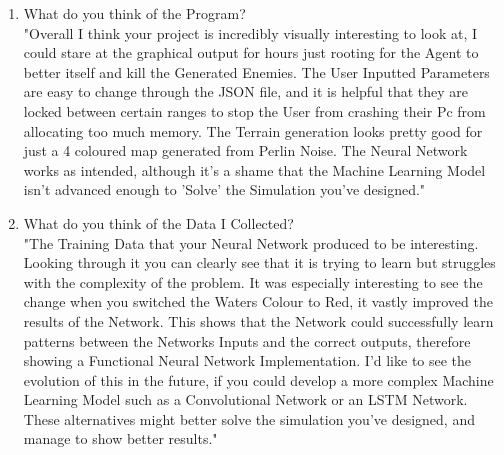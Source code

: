 \begin{flushleft}
        \begin{enumerate}
            \item What do you think of the Program? \\
                \vspace{0.2cm}
                "Overall I think your project is incredibly visually interesting to look at, I could stare at the graphical output for hours
                just rooting for the Agent to better itself and kill the Generated Enemies. The User Inputted Parameters are easy to change
                through the JSON file, and it is helpful that they are locked between certain ranges to stop the User from crashing their Pc
                from allocating too much memory. The Terrain generation looks pretty good for just a 4 coloured map generated from Perlin Noise.
                The Neural Network works as intended, although it's a shame that the Machine Learning Model isn't advanced enough to 'Solve' the
                Simulation you've designed."

            \item What do you think of the Data I Collected? \\
                \vspace{0.2cm}
                "The Training Data that your Neural Network produced to be interesting. Looking through it you can clearly see that it is
                trying to learn but struggles with the complexity of the problem. It was especially interesting to see the change when you switched
                the Waters Colour to Red, it vastly improved the results of the Network. This shows that the Network could successfully learn patterns
                between the Networks Inputs and the correct outputs, therefore showing a Functional Neural Network Implementation. I'd like to see
                the evolution of this in the future, if you could develop a more complex Machine Learning Model such as a Convolutional Network 
                or an LSTM Network. These alternatives might better solve the simulation you've designed, and manage to show better results."


\end{enumerate}
\end{flushleft}
